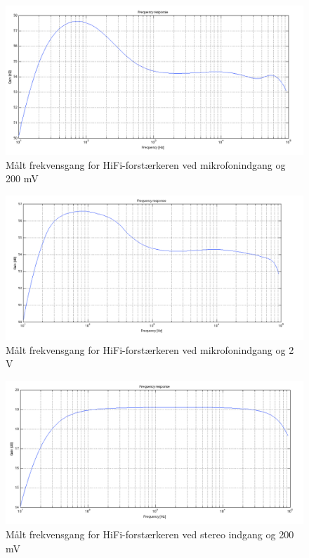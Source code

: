 \begin{figure}[h]
\centering
\includegraphics[width=\textwidth]{maalerapporter/final/mic/final_mic_3,16mv_frekvensgang.png}
\caption{Målt frekvensgang for HiFi-forstærkeren ved mikrofonindgang og 200 mV}
\label{maalerapport_final5}
\end{figure}

\begin{figure}[h]
\centering
\includegraphics[width=\textwidth]{maalerapporter/final/mic/final_mic_31,6mv_frekevensgang.png}
\caption{Målt frekvensgang for HiFi-forstærkeren ved mikrofonindgang og 2 V}
\label{maalerapport_final6}
\end{figure}

\begin{figure}[h]
\centering
\includegraphics[width=\textwidth]{maalerapporter/final/stereo/final_stereo_200mv_frekvensgang.png}
\caption{Målt frekvensgang for HiFi-forstærkeren ved stereo indgang og 200 mV}
\label{maalerapport_final7}
\end{figure}

